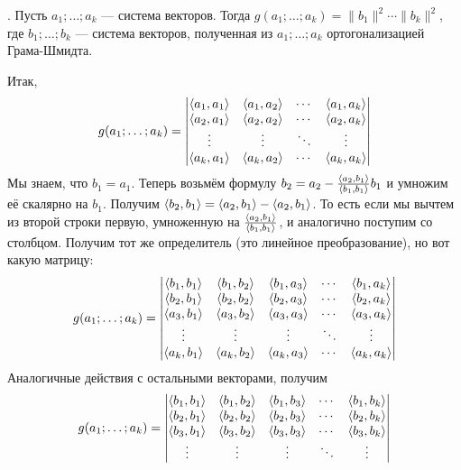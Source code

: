 \documentclass{article}
\begin{document}
\begin{itemize}
        \thm {}. Пусть $a_1;\ldots;a_k$ --- система векторов. Тогда $g(a_1;\ldots;a_k)=\|b_1\|^2\cdots\|b_k\|^2$, где $b_1;\ldots;b_k$ --- система векторов, полученная из $a_1;\ldots;a_k$ ортогонализацией Грама-Шмидта.
        \begin{Proof}
            Итак,
            $$
            g(a_1;\ldots;a_k)=\left|\begin{matrix}
                {\left\langle{a_1},{a_1}\right\rangle} & {\left\langle{a_1},{a_2}\right\rangle} & \cdots & {\left\langle{a_1},{a_k}\right\rangle}\\
                {\left\langle{a_2},{a_1}\right\rangle} & {\left\langle{a_2},{a_2}\right\rangle} & \cdots & {\left\langle{a_2},{a_k}\right\rangle}\\
                \vdots & \vdots & \ddots & \vdots\\
                {\left\langle{a_k},{a_1}\right\rangle} & {\left\langle{a_k},{a_2}\right\rangle} & \cdots & {\left\langle{a_k},{a_k}\right\rangle}\end{matrix}\right|
            $$
            Мы знаем, что $b_1=a_1$. Теперь возьмём формулу $b_2=a_2-\frac{{\left\langle{a_2},{b_1}\right\rangle}}{{\left\langle{b_1},{b_1}\right\rangle}}b_1$ и умножим её скалярно на $b_1$. Получим ${\left\langle{b_2},{b_1}\right\rangle}={\left\langle{a_2},{b_1}\right\rangle}-{\left\langle{a_2},{b_1}\right\rangle}$. То есть если мы вычтем из второй строки первую, умноженную на $\frac{{\left\langle{a_2},{b_1}\right\rangle}}{{\left\langle{b_1},{b_1}\right\rangle}}$, и аналогично поступим со столбцом. Получим тот же определитель (это линейное преобразование), но вот какую матрицу:
            $$
            g(a_1;\ldots;a_k)=\left|\begin{matrix}
                {\left\langle{b_1},{b_1}\right\rangle} & {\left\langle{b_1},{b_2}\right\rangle} & {\left\langle{b_1},{a_3}\right\rangle} & \cdots & {\left\langle{b_1},{a_k}\right\rangle}\\
                {\left\langle{b_2},{b_1}\right\rangle} & {\left\langle{b_2},{b_2}\right\rangle} & {\left\langle{b_2},{a_3}\right\rangle} & \cdots & {\left\langle{b_2},{a_k}\right\rangle}\\
                {\left\langle{a_3},{b_1}\right\rangle} & {\left\langle{a_3},{b_2}\right\rangle} & {\left\langle{a_3},{a_3}\right\rangle} & \cdots & {\left\langle{a_3},{a_k}\right\rangle}\\
                \vdots & \vdots & \vdots & \ddots & \vdots\\
                {\left\langle{a_k},{b_1}\right\rangle} & {\left\langle{a_k},{b_2}\right\rangle} & {\left\langle{a_k},{a_3}\right\rangle} & \cdots & {\left\langle{a_k},{a_k}\right\rangle}\end{matrix}\right|
            $$
            Аналогичные действия с остальными векторами, получим
            $$
            g(a_1;\ldots;a_k)=\left|\begin{matrix}
                {\left\langle{b_1},{b_1}\right\rangle} & {\left\langle{b_1},{b_2}\right\rangle} & {\left\langle{b_1},{b_3}\right\rangle} & \cdots & {\left\langle{b_1},{b_k}\right\rangle}\\
                {\left\langle{b_2},{b_1}\right\rangle} & {\left\langle{b_2},{b_2}\right\rangle} & {\left\langle{b_2},{b_3}\right\rangle} & \cdots & {\left\langle{b_2},{b_k}\right\rangle}\\
                {\left\langle{b_3},{b_1}\right\rangle} & {\left\langle{b_3},{b_2}\right\rangle} & {\left\langle{b_3},{b_3}\right\rangle} & \cdots & {\left\langle{b_3},{b_k}\right\rangle}\\
                \vdots & \vdots & \vdots & \ddots & \vdots\\
\end{matrix}\right|$$
\end{Proof}
\end{itemize}
\end{document}
